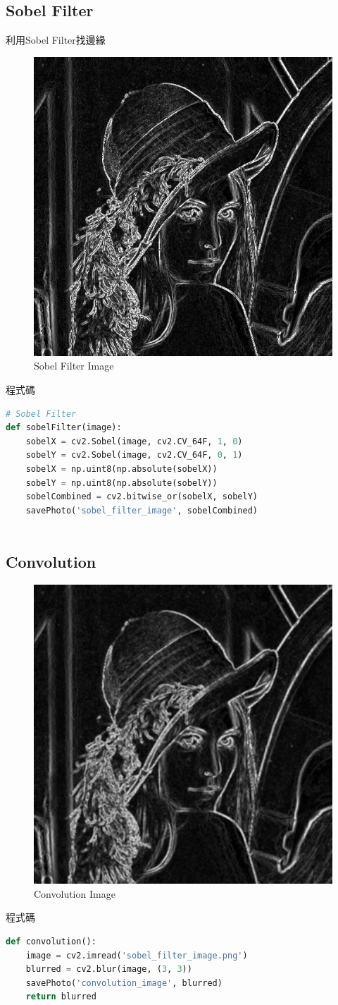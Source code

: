 \documentclass[12pt,a4paper]{article}
\begin{document}
\subsection{Sobel Filter}
{
利用Sobel Filter找邊緣
\begin{figure}[ht]
\centering
\includegraphics[width=.4\textwidth]{image/sobel_filter_image.png}
\caption{Sobel Filter Image}%
\label{要合併的兩張圖}%
\end{figure}

程式碼
\begin{lstlisting}[language=Python]
# Sobel Filter
def sobelFilter(image):
    sobelX = cv2.Sobel(image, cv2.CV_64F, 1, 0)
    sobelY = cv2.Sobel(image, cv2.CV_64F, 0, 1)
    sobelX = np.uint8(np.absolute(sobelX))
    sobelY = np.uint8(np.absolute(sobelY))
    sobelCombined = cv2.bitwise_or(sobelX, sobelY)
    savePhoto('sobel_filter_image', sobelCombined)
    
\end{lstlisting}
}

\newpage
\subsection{Convolution}
{
\begin{figure}[ht]
\centering
\includegraphics[width=.4\textwidth]{image/convolution_image.png}
\caption{Convolution Image}%
\label{要合併的兩張圖}%
\end{figure}

程式碼
\begin{lstlisting}[language=Python]
def convolution():
    image = cv2.imread('sobel_filter_image.png')
    blurred = cv2.blur(image, (3, 3))
    savePhoto('convolution_image', blurred)
    return blurred
    
\end{lstlisting}
}
\end{document}
